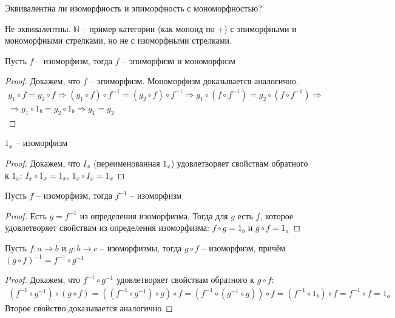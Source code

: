 Эквивалентна ли изоморфность и эпиморфность с мономорфностью?
\begin{exm}
  Не эквивалентны. $\mathbb{N}$ -- пример категории (как моноид по $+$) с
  эпиморфными и мономорфными стрелками, но не с изоморфными стрелками.
\end{exm}

\begin{task}
  Пусть $f$ -- изоморфизм, тогда $f$ -- эпиморфизм и мономорфизм
\end{task}
\begin{proof}
  Докажем, что $f$ -- эпиморфизм. Мономорфизм доказывается аналогично.
  \begin{gather*}
    g_1 \circ f = g_2 \circ f \Rightarrow
    (g_1 \circ f) \circ f^{-1} = (g_2 \circ f) \circ f^{-1} \Rightarrow
    g_1 \circ (f \circ f^{-1}) = g_2 \circ (f \circ f^{-1}) \Rightarrow \\
    \Rightarrow g_1 \circ 1_b = g_2 \circ 1_b \Rightarrow
    g_1 = g_2
  \end{gather*}
\end{proof}

\begin{task}
  $1_x$ -- изоморфизм
\end{task}
\begin{proof}
  Докажем, что $I_x$ (переименованная $1_x$) удовлетворяет свойствам обратного к $1_x$:
  $I_x \circ 1_x = 1_x$, $1_x \circ I_x = 1_x$
\end{proof}

\begin{task}
  Пусть $f$ -- изоморфизм, тогда $f^{-1}$ -- изоморфизм
\end{task}
\begin{proof}
  Есть $g = f^{-1}$ из определения изоморфизма. Тогда для $g$ есть $f$, которое
  удовлетворяет свойствам из определения изоморфизма: $f \circ g = 1_b$ и
  $g \circ f = 1_a$
\end{proof}

\begin{task}
  Пусть $f \colon a \to b$ и $g \colon b \to c$ -- изоморфизмы, тогда $g \circ f$ -- изоморфизм, причём
  $(g \circ f)^{-1} = f^{-1} \circ g^{-1}$
\end{task}
\begin{proof}
  Докажем, что $f^{-1} \circ g^{-1}$ удовлетворяет свойствам обратного к
  $g \circ f$:
  \begin{gather*}
    (f^{-1} \circ g^{-1}) \circ (g \circ f) =
    ((f^{-1} \circ g^{-1}) \circ g) \circ f =
    (f^{-1} \circ (g^{-1} \circ g)) \circ f =
    (f^{-1} \circ 1_b) \circ f =
    f^{-1} \circ f = 1_a
  \end{gather*}
  Второе свойство доказывается аналогично
\end{proof}